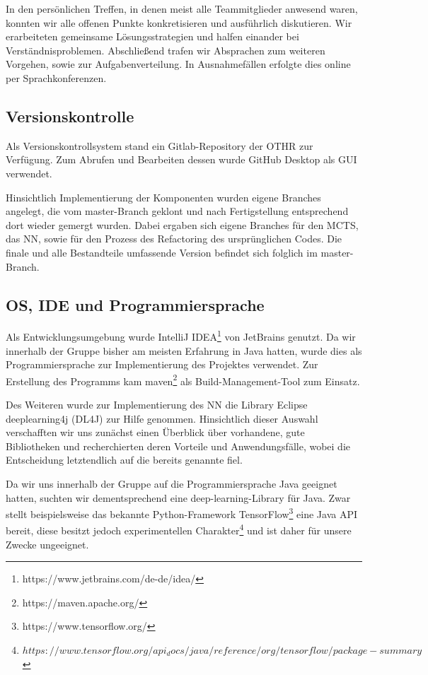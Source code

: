 \documentclass[12pt,a4paper]{article}
\begin{document}
In den persönlichen Treffen, in denen meist alle Teammitglieder anwesend waren, konnten wir alle offenen Punkte konkretisieren und ausführlich diskutieren. Wir erarbeiteten gemeinsame Lösungsstrategien und halfen einander bei Verständnisproblemen. Abschließend trafen wir Absprachen zum weiteren Vorgehen, sowie zur Aufgabenverteilung. In Ausnahmefällen erfolgte dies online per Sprachkonferenzen.

\subsection{Versionskontrolle}
Als Versionskontrollsystem stand ein Gitlab-Repository der OTHR zur Verfügung. Zum Abrufen und Bearbeiten dessen wurde GitHub Desktop als GUI verwendet.

Hinsichtlich Implementierung der Komponenten wurden eigene Branches angelegt, die vom master-Branch geklont und nach Fertigstellung entsprechend dort wieder gemergt wurden. Dabei ergaben sich eigene Branches für den MCTS, das NN, sowie für den Prozess des Refactoring des ursprünglichen Codes. Die finale und alle Bestandteile umfassende Version befindet sich folglich im master-Branch.

\subsection{OS, IDE und Programmiersprache}
Als Entwicklungsumgebung wurde IntelliJ IDEA\footnote{https://www.jetbrains.com/de-de/idea/} von JetBrains genutzt. Da wir innerhalb der Gruppe bisher am meisten Erfahrung in Java hatten, wurde dies als Programmiersprache zur Implementierung des Projektes verwendet. Zur Erstellung des Programms kam maven\footnote{https://maven.apache.org/} als Build-Management-Tool zum Einsatz.

Des Weiteren wurde zur Implementierung des NN die Library Eclipse deeplearning4j (DL4J) \cite{DL4J} zur Hilfe genommen. Hinsichtlich dieser Auswahl verschafften wir uns zunächst einen Überblick über vorhandene, gute Bibliotheken und recherchierten deren Vorteile und Anwendungsfälle, wobei die Entscheidung letztendlich auf die bereits genannte fiel.

Da wir uns innerhalb der Gruppe auf die Programmiersprache Java geeignet hatten, suchten wir dementsprechend eine deep-learning-Library für Java. Zwar stellt beispielsweise das bekannte Python-Framework TensorFlow\footnote{https://www.tensorflow.org/} eine Java API bereit, diese besitzt jedoch experimentellen Charakter\footnote{$https://www.tensorflow.org/api_docs/java/reference/org/tensorflow/package-summary$} und ist daher für unsere Zwecke ungeeignet. 
\end{document}

